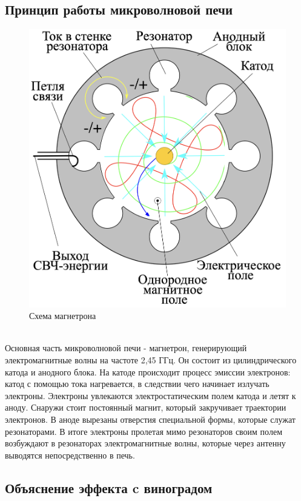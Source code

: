 \documentclass[a4paper,12pt]{article}
\begin{document}
	\subsection*{Принцип работы микроволновой печи} 
    \begin{figure}
		\centering
		\includegraphics[scale=0.2]{magn}
		\caption{Схема магнетрона}
	\end{figure}
	\\ Основная часть микроволновой печи - магнетрон, генерирующий электромагнитные волны на частоте 2,45 ГГц. Он состоит из цилиндрического катода и анодного блока. На катоде происходит процесс эмиссии электронов: катод с помощью тока нагревается, в следствии чего начинает излучать электроны. Электроны увлекаются электростатическим полем катода и летят к аноду. Снаружи стоит постоянный магнит, который закручивает траектории электронов. В аноде вырезаны отверстия специальной формы, которые служат резонаторами. В итоге электроны пролетая мимо резонаторов своим полем возбуждают в резонаторах электромагнитные волны, которые через антенну выводятся непосредственно в печь.
	\\ \subsection*{Объяснение эффекта c виноградом}
\end{document}
